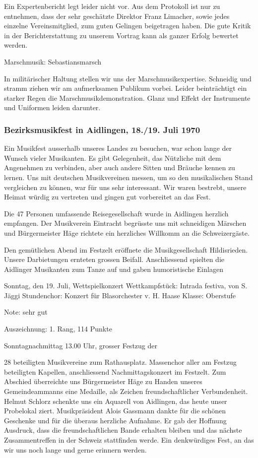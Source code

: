 \begin{history}
    Ein Expertenbericht legt leider nicht vor. Aus dem Protokoll ist nur zu
    entnehmen, dass der sehr geschätzte Direktor Franz Limacher, sowie jedes
    einzelne Vereinsmitglied, zum guten Gelingen beigetragen haben. Die gute
    Kritik in der Berichterstattung zu unserem Vortrag kann als ganzer Erfolg
    bewertet werden.

    Marschmusik: Sebastiansmarsch

    In militärischer Haltung stellen wir uns der Marschmusikexpertise. Schneidig
    und stramm ziehen wir am aufmerksamen Publikum vorbei. Leider beinträchtigt
    ein starker Regen die Marschmusikdemonstration. Glanz und Effekt der
    Instrumente und Uniformen leiden darunter.

    \subsubsection*{Bezirksmusikfest in Aidlingen, 18./19. Juli 1970}

    Ein Musikfest ausserhalb unseres Landes zu besuchen, war schon lange der
    Wunsch vieler Musikanten. Es gibt Gelegenheit, das Nützliche mit dem
    Angenehmen zu verbinden, aber auch andere Sitten und Bräuche kennen zu
    lernen. Uns mit deutschen Musikvereinen messen, um so den musikalischen
    Stand vergleichen zu können, war für uns sehr interessant. Wir waren
    bestrebt, unsere Heimat würdig zu vertreten und gingen gut vorbereitet an
    das Fest.

    Die 47 Personen umfassende Reisegesellschaft wurde in Aidlingen
    herzlich empfangen. Der Musikverein Eintracht begrüsste uns mit schneidigen
    Märschen und Bürgermeister Häge richtete ein herzliches Willkomm an die
    Schweizergäste.

    Den gemütlichen Abend im Festzelt eröffnete die Musikgesellschaft
    Hildisrieden. Unsere Darbietungen ernteten grossen Beifall. Anschliessend
    spielten die Aidlinger Musikanten zum Tanze auf und gaben humoristische
    Einlagen

    Sonntag, den 19. Juli, Wettspielkonzert Wettkampfstück: Intrada festiva, von
    S. Jäggi Stundenchor: Konzert für Blasorchester v. H. Haase Klasse:
    Oberstufe

    Note: sehr gut

    Auszeichnung: 1. Rang, 114 Punkte

    Sonntagnachmittag 13.00 Uhr, grosser Festzug der

    28 beteiligten Musikvereine zum Rathausplatz. Massenchor aller am Festzug
    beteiligten Kapellen, anschliessend Nachmittagskonzert im Festzelt. Zum
    Abschied überreichte uns Bürgermeister Häge zu Handen unseres
    Gemeindeammanns eine Medaille, als Zeichen freundschaftlicher Verbundenheit.
    Helmut Schlorz schenkte uns ein Aquarell von Aidlingen, das heute unser
    Probelokal ziert. Musikpräsident Alois Gassmann dankte für die schönen
    Geschenke und für die überaus herzliche Aufnahme. Er gab der Hoffnung
    Ausdruck, dass die freundschaftlichen Bande erhalten bleiben und das nächste
    Zusammentreffen in der Schweiz stattfinden werde. Ein denkwürdiges Fest, an
    das wir uns noch lange und gerne erinnern werden.


\end{history}
